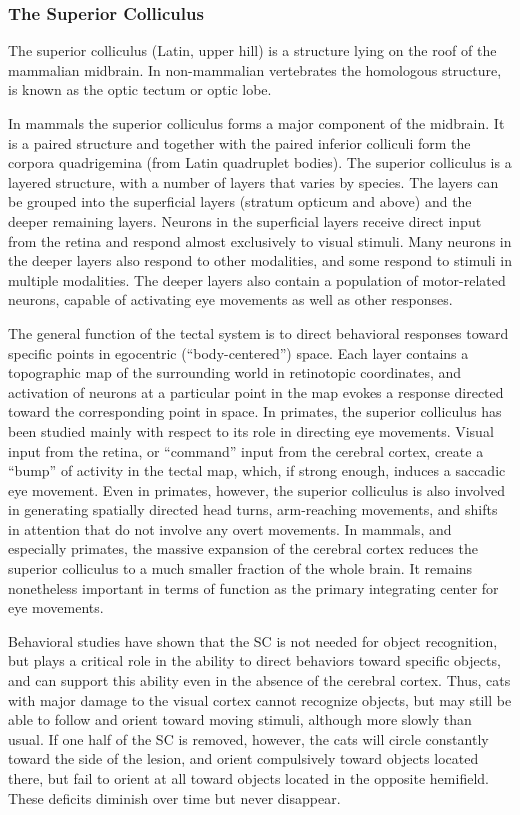 \hypertarget{the-superior-colliculus}{%
\subsubsection{The Superior Colliculus}\label{the-superior-colliculus}}

The superior colliculus (Latin, upper hill) is a structure lying on the
roof of the mammalian midbrain. In non-mammalian vertebrates the
homologous structure, is known as the optic tectum or optic lobe.

In mammals the superior colliculus forms a major component of the
midbrain. It is a paired structure and together with the paired inferior
colliculi form the corpora quadrigemina (from Latin quadruplet bodies).
The superior colliculus is a layered structure, with a number of layers
that varies by species. The layers can be grouped into the superficial
layers (stratum opticum and above) and the deeper remaining layers.
Neurons in the superficial layers receive direct input from the retina
and respond almost exclusively to visual stimuli. Many neurons in the
deeper layers also respond to other modalities, and some respond to
stimuli in multiple modalities. The deeper layers also contain a
population of motor-related neurons, capable of activating eye movements
as well as other responses.

The general function of the tectal system is to direct behavioral
responses toward specific points in egocentric (``body-centered'')
space. Each layer contains a topographic map of the surrounding world in
retinotopic coordinates, and activation of neurons at a particular point
in the map evokes a response directed toward the corresponding point in
space. In primates, the superior colliculus has been studied mainly with
respect to its role in directing eye movements. Visual input from the
retina, or ``command'' input from the cerebral cortex, create a ``bump''
of activity in the tectal map, which, if strong enough, induces a
saccadic eye movement. Even in primates, however, the superior
colliculus is also involved in generating spatially directed head turns,
arm-reaching movements, and shifts in attention that do not involve any
overt movements. In mammals, and especially primates, the massive
expansion of the cerebral cortex reduces the superior colliculus to a
much smaller fraction of the whole brain. It remains nonetheless
important in terms of function as the primary integrating center for eye
movements.

Behavioral studies have shown that the SC is not needed for object
recognition, but plays a critical role in the ability to direct
behaviors toward specific objects, and can support this ability even in
the absence of the cerebral cortex. Thus, cats with major damage to the
visual cortex cannot recognize objects, but may still be able to follow
and orient toward moving stimuli, although more slowly than usual. If
one half of the SC is removed, however, the cats will circle constantly
toward the side of the lesion, and orient compulsively toward objects
located there, but fail to orient at all toward objects located in the
opposite hemifield. These deficits diminish over time but never
disappear.


